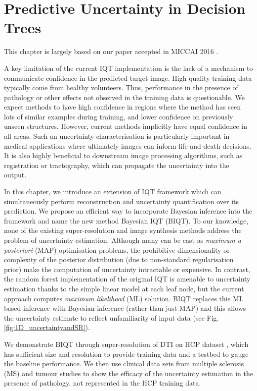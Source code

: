 \chapter{Predictive Uncertainty in Decision Trees}
\label{chapter:biqt}
This chapter is largely based on our paper accepted in MICCAI 2016 \cite{tanno2016bayesian}.

A key limitation of the current IQT implementation is the lack of a mechanism to communicate confidence in the predicted target image. High quality training data typically come from healthy volunteers. Thus, performance in the presence of pathology or other effects not observed in the training data is questionable. We expect methods to have high confidence in regions where the method has seen lots of similar examples during training, and lower confidence on previously unseen structures. However, current methods implicitly have equal confidence in all areas. Such an uncertainty characterisation is particularly important in medical applications where ultimately images can inform life-and-death decisions. It is also highly beneficial to downstream image processing algorithms, such as registration or tractography, which can propagate the uncertainty into the output.

In this chapter, we introduce an extension of IQT framework which can simultaneously perform reconstruction and uncertainty quantification over its prediction. We propose an efficient way to incorporate Bayesian inference into the framework and name the new method Bayesian IQT (BIQT). To our knowledge, none of the existing super-resolution \cite{rousseau2008brain,coupe2013collaborative,rueda2013single,wang2014sparse} and image synthesis methods \cite{ye2013modality,jog2015mr,burgos2015robust,wein2008automatic} address the problem of uncertainty estimation. Although many can be cast as \textit{maximum a posteriori} (MAP) optimisation problems, the prohibitive dimensionality or complexity of the posterior distribution (due to non-standard regularisation prior) make the computation of uncertainty intractable or expensive. In contrast, the random forest implementation of the original IQT is amenable to uncertainty estimation thanks to the simple linear model at each leaf node, but the current approach computes \textit{maximum likelihood} (ML) solution. BIQT replaces this ML based inference with Bayesian inference (rather than just MAP) and this allows the uncertainty estimate to reflect unfamiliarity of input data (see Fig. \ref{fig:1D_uncertaintyandSR}).

We demonstrate BIQT through super-resolution of DTI on HCP dataset \cite{sotiropoulos2013advances}, which has sufficient size and resolution to provide training data and a testbed to gauge the baseline performance. We then use clinical data sets from multiple sclerosis (MS) and tumour studies to show the efficacy of the uncertainty estimation in the presence of pathology, not represented in the HCP training data.

